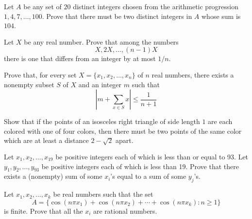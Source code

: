 \documentclass{article}
\begin{document}
\begin{exercise} %
    Let $A$ be any set of $20$ distinct integers chosen from the arithmetic progression $1,4,7,\dots, 100$. Prove that there must be two distinct integers in $A$ whose sum is $104$.
\end{exercise}

\begin{exercise}
    Let \(X\) be any real number. Prove that among the numbers 
    \[X,2X,\dots,(n-1)X\] 
    there is one that differs from an integer by at most \(1/n\).
\end{exercise}

\begin{exercise}[2006 B2]
    Prove that, for every set \(X=\{x_1,x_2,\dots,x_n\}\) of \(n\) real numbers, there exists a nonempty subset \(S\) of \(X\) and an integer \(m\) such that 
    \[\left|m+\sum_{x\in S} x\right| \leq \frac{1}{n+1}\]
\end{exercise}
    
\begin{exercise}[1994 A3]
    Show that if the points of an isosceles right triangle of side length $1$ are each colored with one of four colors, then there must be two points of the same color which are at least a distance \(2-\sqrt{2}\) apart. 
\end{exercise}
    
\begin{exercise}[1993 A4]
    Let \(x_1,x_2,\dots,x_{19}\) be positive integers each of which is less than or equal to 93. 
    Let \(y_1,y_2,\dots,y_{93}\) be positive integers each of which is less than 19. 
    Prove that there exists a (nonempty) sum of some \(x_{i}\)'s equal to a sum of some \(y_j\)'s.
\end{exercise}

\begin{exercise}
    Let \(x_1,x_2,\dots,x_k\) be real numbers such that the set 
    \[A=\{\cos(n\pi x_1)+\cos(n\pi x_2)+\cdots+\cos(n\pi x_k) : n\geq 1\}\] 
    is finite. Prove that all the \(x_i\) are rational numbers.
\end{exercise}
\end{document}
